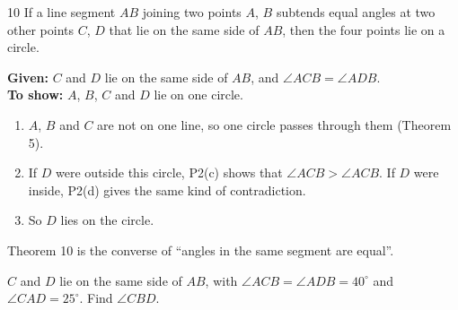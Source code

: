 \begin{theorem}{10}
If a line segment $AB$ joining two points $A$, $B$ subtends equal angles at two other points $C$, $D$ that lie on the same side of $AB$, then the four points lie on a circle.
\end{theorem}


\why
\textbf{Given:} $C$ and $D$ lie on the same side of $AB$, and $\angle ACB=\angle ADB$.\\
\textbf{To show:} $A$, $B$, $C$ and $D$ lie on one circle.
\begin{enumerate}[leftmargin=1.8em,itemsep=1pt]
  \item $A$, $B$ and $C$ are not on one line, so one circle passes through them (Theorem 5).
  \item If $D$ were outside this circle, P2(c) shows that $\angle ACB>\angle ACB$. If $D$ were inside, P2(d) gives the same kind of contradiction.
  \item So $D$ lies on the circle.
\end{enumerate}
Theorem 10 is the converse of ``angles in the same segment are equal''.

\begin{example}
$C$ and $D$ lie on the same side of $AB$, with $\angle ACB=\angle ADB=40^\circ$ and $\angle CAD=25^\circ$. Find $\angle CBD$.
\end{example}

